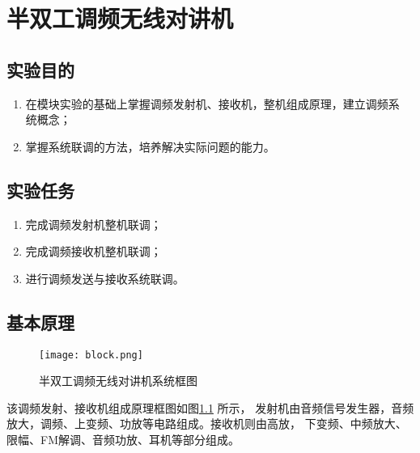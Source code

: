 \documentclass[../main]{subfiles}
\begin{document}
\chapter{半双工调频无线对讲机}%
\label{cha:半双工调频无线对讲机}

\section{实验目的}%
\label{sec:\arabic{chapter}实验目的}

\begin{enumerate}

	\item 在模块实验的基础上掌握调频发射机、接收机，整机组成原理，建立调频系
		统概念；

	\item 掌握系统联调的方法，培养解决实际问题的能力。

\end{enumerate}

\section{实验任务}%
\label{sec:\arabic{chapter}实验任务}

\begin{enumerate}

	\item 完成调频发射机整机联调；

	\item 完成调频接收机整机联调；

	\item 进行调频发送与接收系统联调。

\end{enumerate}

\section{基本原理}%
\label{sec:\arabic{chapter}基本原理}

\begin{figure}[htbp]
	\centering
	\texttt{[image: block.png]}
	\caption{半双工调频无线对讲机系统框图}
	\label{fig:半双工调频无线对讲机系统框图}
\end{figure}

该调频发射、接收机组成原理框图如图\ref{fig:半双工调频无线对讲机系统框图} 所示，
发射机由音频信号发生器，音频放大，调频、上变频、功放等电路组成。接收机则由高放，
下变频、中频放大、限幅、FM解调、音频功放、耳机等部分组成。
\end{document}
